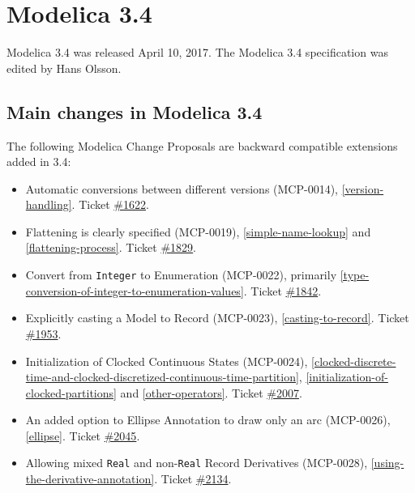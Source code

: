 \section{Modelica 3.4}\label{modelica-3-4}

Modelica 3.4 was released April 10, 2017. The Modelica 3.4 specification
was edited by Hans Olsson.

\subsection{Main changes in Modelica 3.4}\label{main-changes-in-modelica-3-4}

The following Modelica Change Proposals are backward compatible
extensions added in 3.4:
\begin{itemize}
\item
  Automatic conversions between different versions (MCP-0014),
  \cref{version-handling}. Ticket
  \href{https://github.com/modelica/ModelicaSpecification/issues/1622}{\#1622}.
\item
  Flattening is clearly specified (MCP-0019), \cref{simple-name-lookup} and \cref{flattening-process}.
  Ticket \href{https://github.com/modelica/ModelicaSpecification/issues/1829}{\#1829}.
\item
  Convert from \lstinline!Integer! to Enumeration (MCP-0022), primarily \cref{type-conversion-of-integer-to-enumeration-values}.
  Ticket \href{https://github.com/modelica/ModelicaSpecification/issues/1842}{\#1842}.
\item
  Explicitly casting a Model to Record (MCP-0023), \cref{casting-to-record}.
  Ticket \href{https://github.com/modelica/ModelicaSpecification/issues/1953}{\#1953}.
\item
  Initialization of Clocked Continuous States (MCP-0024),
  \cref{clocked-discrete-time-and-clocked-discretized-continuous-time-partition},
  \cref{initialization-of-clocked-partitions} and \cref{other-operators}. Ticket
  \href{https://github.com/modelica/ModelicaSpecification/issues/2007}{\#2007}.
\item
  An added option to Ellipse Annotation to draw only an arc (MCP-0026),
  \cref{ellipse}. Ticket
  \href{https://github.com/modelica/ModelicaSpecification/issues/2045}{\#2045}.
\item
  Allowing mixed \lstinline!Real! and non-\lstinline!Real! Record Derivatives (MCP-0028), \cref{using-the-derivative-annotation}.
  Ticket \href{https://github.com/modelica/ModelicaSpecification/issues/2134}{\#2134}.
\end{itemize}

